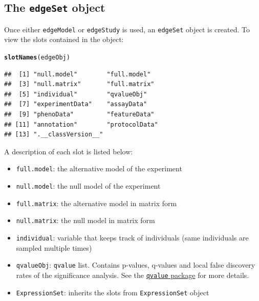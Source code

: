 \documentclass{article}\usepackage[]{graphicx}\usepackage[]{color}
\makeatletter
\newcommand{\hlstd}[1]{\textcolor[rgb]{0.345,0.345,0.345}{#1}}%
\newcommand{\hlkwd}[1]{\textcolor[rgb]{0.737,0.353,0.396}{\textbf{#1}}}%
\newenvironment{kframe}{%
 \def\at@end@of@kframe{}%
 \ifinner\ifhmode%
  \def\at@end@of@kframe{\end{minipage}}%
  \begin{minipage}{\columnwidth}%
 \fi\fi%
 \def\FrameCommand##1{\hskip\@totalleftmargin \hskip-\fboxsep
 \colorbox{shadecolor}{##1}\hskip-\fboxsep
     \hskip-\linewidth \hskip-\@totalleftmargin \hskip\columnwidth}%
 \MakeFramed {\advance\hsize-\width
   \@totalleftmargin\z@ \linewidth\hsize
   \@setminipage}}%
 {\par\unskip\endMakeFramed%
 \at@end@of@kframe}
\newenvironment{knitrout}{}{} %
\makeatother
\begin{document}
\subsection{The {\tt edgeSet} object}
Once either {\tt edgeModel} or {\tt edgeStudy} is used, an {\tt edgeSet} object is created. To view the slots contained in the object:
\begin{knitrout}
\color{fgcolor}\begin{kframe}
\begin{alltt}
\hlkwd{slotNames}\hlstd{(edgeObj)}
\end{alltt}
\begin{verbatim}
##  [1] "null.model"        "full.model"       
##  [3] "null.matrix"       "full.matrix"      
##  [5] "individual"        "qvalueObj"        
##  [7] "experimentData"    "assayData"        
##  [9] "phenoData"         "featureData"      
## [11] "annotation"        "protocolData"     
## [13] ".__classVersion__"
\end{verbatim}
\end{kframe}
\end{knitrout}
A description of each slot is listed below: 
\begin{itemize}
\item {\tt full.model}: the alternative model of the experiment
\item {\tt null.model}: the null model of the experiment
\item {\tt full.matrix}: the alternative model in matrix form
\item {\tt null.matrix}: the null model in matrix form
\item {\tt individual}: variable that keeps track of individuals (same individuals are sampled multiple times)
\item {\tt qvalueObj}: {\tt qvalue} list. Contains p-values, q-values and local false discovery rates of the significance analysis. See the \href{http://www.bioconductor.org/packages/release/bioc/html/qvalue.html}{{\tt qvalue} package} for more details.
\item {\tt ExpressionSet}: inherits the slots from {\tt ExpressionSet} object
\end{itemize}
\end{document}
